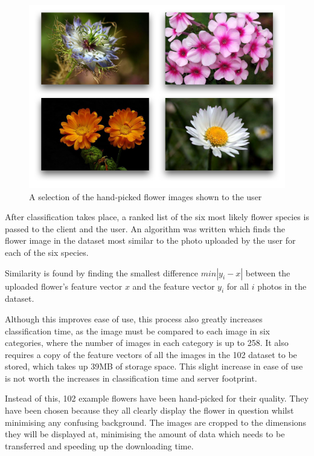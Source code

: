 \documentclass[11pt, a4paper]{report}
\begin{document}
\begin{figure}[hbt]
	\centering
  \includegraphics[totalheight=8cm]{img/14.png}
  \caption{A selection of the hand-picked flower images shown to the user}
  \label{img:14}
\end{figure}

After classification takes place, a ranked list of the six most likely flower species is passed to the client and the user. An algorithm was written which finds the flower image in the dataset most similar to the photo uploaded by the user for each of the six species.  %



Similarity is found by finding the smallest difference $min|y_i - x|$ between the uploaded flower's feature vector $x$ and the feature vector $y_i$ for all $i$ photos in the dataset. 

Although this improves ease of use, this process also greatly increases classification time, as the image must be compared to each image in six categories, where the number of images in each category is up to 258. It also requires a copy of the feature vectors of all the images in the 102 dataset to be stored, which takes up 39MB of storage space. This slight increase in ease of use is not worth the increases in classification time and server footprint.

Instead of this, 102 example flowers have been hand-picked for their quality. They have been chosen because they all clearly display the flower in question whilst minimising any confusing background. The images are cropped to the dimensions they will be displayed at, minimising the amount of data which needs to be transferred and speeding up the downloading time. 
\end{document}
